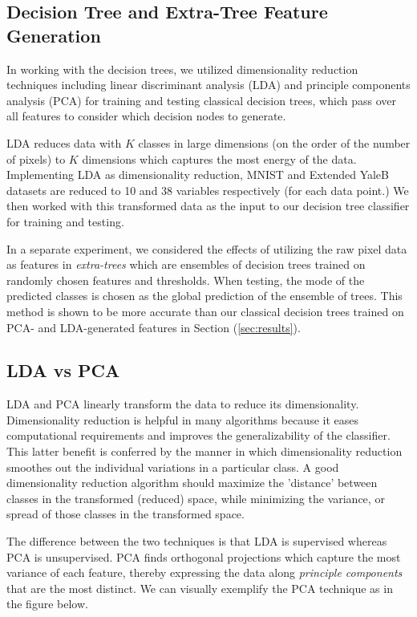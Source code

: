 \subsection{Decision Tree  and Extra-Tree Feature Generation}

In working with the decision trees, we utilized dimensionality reduction techniques including linear discriminant analysis (LDA) and principle components analysis (PCA) for training and testing classical decision trees, which pass over all features to consider which decision nodes to generate. 

LDA reduces data with $K$ classes in large dimensions (on the order of the number of pixels) to 
$K$ dimensions which captures the most energy of the data. Implementing LDA as dimensionality reduction, MNIST and Extended YaleB datasets are reduced to 10 and 38 variables respectively (for each data point.) We then worked with this transformed data as the input to our decision tree classifier for training and testing.

In a separate experiment, we considered the effects of utilizing the raw pixel data as features in \emph{extra-trees} which are ensembles of decision trees trained on randomly chosen features and thresholds. When testing, the mode of the predicted classes is chosen as the global prediction of the ensemble of trees. This method is shown to be more accurate than our classical decision trees trained on PCA- and LDA-generated features in Section (\ref{sec:results}).

\subsection{LDA vs PCA}

LDA and PCA linearly transform the data to reduce its dimensionality. Dimensionality reduction is helpful in many algorithms because it eases computational requirements and improves the generalizability of the classifier. This latter benefit is conferred by the manner in which dimensionality reduction smoothes out the individual variations in a particular class. A good dimensionality reduction algorithm should maximize the 'distance' between classes in the transformed (reduced) space, while minimizing the variance, or spread of those classes in the transformed space. 

The difference between the two techniques is that LDA is supervised whereas PCA is unsupervised. PCA finds orthogonal projections which capture the most variance of each feature, thereby expressing the data along \emph{principle components} that are the most distinct. We can visually exemplify the PCA technique as in the figure below. 

